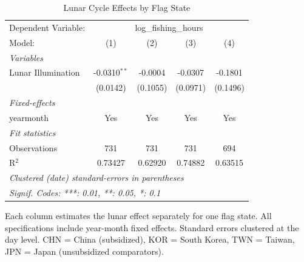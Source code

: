 
\begin{table}[htbp]
   \caption{\label{tab:byflag} Lunar Cycle Effects by Flag State}
   \centering
   \begin{tabular}{lcccc}
      \tabularnewline \midrule \midrule
      Dependent Variable: & \multicolumn{4}{c}{log\_fishing\_hours}\\
      Model:             & (1)            & (2)      & (3)      & (4)\\  
      \midrule
      \emph{Variables}\\
      Lunar Illumination & -0.0310$^{**}$ & -0.0004  & -0.0307  & -0.1801\\   
                         & (0.0142)       & (0.1055) & (0.0971) & (0.1496)\\   
      \midrule
      \emph{Fixed-effects}\\
      yearmonth          & Yes            & Yes      & Yes      & Yes\\  
      \midrule
      \emph{Fit statistics}\\
      Observations       & 731            & 731      & 731      & 694\\  
      R$^2$              & 0.73427        & 0.62920  & 0.74882  & 0.63515\\  
      \midrule \midrule
      \multicolumn{5}{l}{\emph{Clustered (date) standard-errors in parentheses}}\\
      \multicolumn{5}{l}{\emph{Signif. Codes: ***: 0.01, **: 0.05, *: 0.1}}\\
   \end{tabular}
   
   \par \raggedright 
   Each column estimates the lunar effect separately for one flag state. All specifications include year-month fixed effects. Standard errors clustered at the day level. CHN = China (subsidized), KOR = South Korea, TWN = Taiwan, JPN = Japan (unsubsidized comparators).
\end{table}


